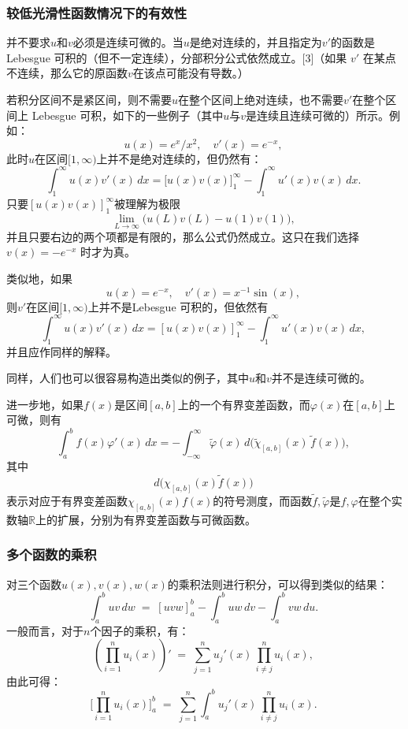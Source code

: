 \subsubsection{较低光滑性函数情况下的有效性}
并不要求$u$和$v$必须是连续可微的。当$u$是绝对连续的，并且指定为$v'$的函数是Lebesgue 可积的（但不一定连续），分部积分公式依然成立。[3]（如果 $v'$ 在某点不连续，那么它的原函数$v$在该点可能没有导数。）

若积分区间不是紧区间，则不需要$u$在整个区间上绝对连续，也不需要$v'$在整个区间上 Lebesgue 可积，如下的一些例子（其中$u$与$v$是连续且连续可微的）所示。例如：
$$
u(x) = e^x/x^2, \quad v'(x) = e^{-x},~
$$
此时$u$在区间$[1,\infty)$上并不是绝对连续的，但仍然有：
$$
\int_{1}^{\infty} u(x)v'(x)\,dx 
= \Big[u(x)v(x)\Big]_{1}^{\infty} - \int_{1}^{\infty} u'(x)v(x)\,dx .~
$$
只要$[u(x)v(x)]_{1}^{\infty}$被理解为极限
$$
\lim_{L \to \infty} \big(u(L)v(L) - u(1)v(1)\big),~
$$
并且只要右边的两个项都是有限的，那么公式仍然成立。这只在我们选择$v(x) = -e^{-x}$
时才为真。

类似地，如果
$$
u(x) = e^{-x}, \quad v'(x) = x^{-1}\sin(x),~
$$
则$v'$在区间$[1,\infty)$上并不是Lebesgue 可积的，但依然有
$$
\int_{1}^{\infty} u(x)v'(x)\,dx = [u(x)v(x)]_{1}^{\infty} - \int_{1}^{\infty} u'(x)v(x)\,dx,~
$$
并且应作同样的解释。

同样，人们也可以很容易构造出类似的例子，其中$u$和$v$并不是连续可微的。

进一步地，如果$f(x)$是区间$[a,b]$上的一个有界变差函数，而$\varphi(x)$在$[a,b]$上可微，则有
$$
\int_{a}^{b} f(x)\varphi'(x)\,dx = -\int_{-\infty}^{\infty} \widetilde{\varphi}(x)\, d\big(\widetilde{\chi}_{[a,b]}(x)\,\widetilde{f}(x)\big),~
$$
其中
$$
d\big(\chi_{[a,b]}(x)\widetilde{f}(x)\big)~
$$
表示对应于有界变差函数$\chi_{[a,b]}(x)f(x)$的符号测度，而函数$\widetilde{f}, \widetilde{\varphi}$是$f, \varphi$在整个实数轴$\mathbb{R}$上的扩展，分别为有界变差函数与可微函数。
\subsubsection{多个函数的乘积}
对三个函数$u(x), v(x), w(x)$的乘积法则进行积分，可以得到类似的结果：
$$
\int_{a}^{b} uv\,dw \;=\; [uvw]_{a}^{b} - \int_{a}^{b} uw\,dv - \int_{a}^{b} vw\,du.~
$$
一般而言，对于$n$个因子的乘积，有：
$$
\left(\prod_{i=1}^{n} u_i(x)\right)' \;=\; \sum_{j=1}^{n} u_j'(x)\,\prod_{i \neq j}^{n} u_i(x),~
$$
由此可得：
$$
\Bigg[\prod_{i=1}^{n} u_i(x)\Bigg]_{a}^{b} \;=\; \sum_{j=1}^{n} \int_{a}^{b} u_j'(x)\,\prod_{i \neq j}^{n} u_i(x).~
$$
